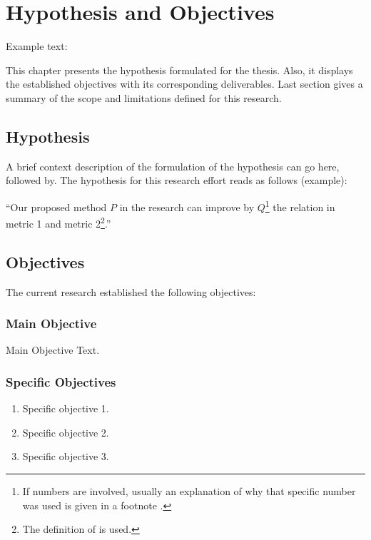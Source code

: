 \chapter{Hypothesis and Objectives}
\label{chapter:hypothesis-objectives}
Example text:

This chapter presents the hypothesis formulated for the thesis. Also, it displays the established objectives with its corresponding deliverables. Last section gives a summary of the scope and limitations defined for this research.

\section{Hypothesis}
\label{section:hypothesis}
A brief context description of the formulation of the hypothesis can go here, followed by.
The hypothesis for this research effort reads as follows (example):

``Our proposed method $P$ in the research can improve by $Q$\footnote{If numbers are involved, usually an explanation of why that specific number was used is given in a footnote \cite{examplereference2}.} the relation in metric 1 and metric 2\footnote{The \cite{examplereference} definition of is used.}.''

\section{Objectives}
\label{section:objectives}
The current research established the following objectives:

\subsection{Main Objective}
\label{section:main-objective}
\label{objective:main}
Main Objective Text.

\subsection{Specific Objectives}
\label{section:specific-objectives}

\begin{enumerate}
	\item Specific objective 1.
	
	\item Specific objective 2.
	
	\item Specific objective 3.
	
\end{enumerate}

